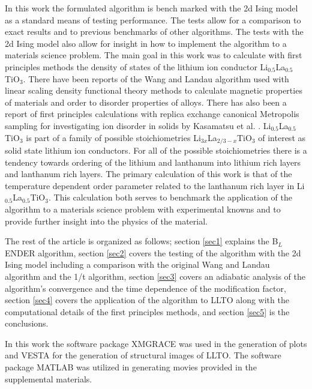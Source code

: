 \documentclass[aps,pre,reprint,superscriptaddress,showkeys]{revtex4-2}
\begin{document}
   In this work the formulated algorithm is bench marked with the 2d Ising model as a standard means of testing  performance.  The tests allow for a comparison to exact results and to previous benchmarks of other algorithms. The tests with the 2d Ising model also allow for insight in how to implement the algorithm to a materials science problem. The main goal in this work  was to calculate with first principles methods the  density of states of the lithium ion conductor Li$_{0.5}$La$_{0.5}$TiO$_3$. There  have been  reports of the Wang and Landau algorithm used with linear scaling density functional theory methods to calculate magnetic properties of materials and order to disorder properties of alloys\cite{Eisenbach, FP_Wang_Landau_CuZn}. There has also been a report of first principles calculations with replica exchange canonical Metropolis sampling for investigating ion disorder in solids by Kasamatsu et al. \cite{ion_disorder_replica}.  Li$_{0.5}$La$_{0.5}$TiO$_3$ is part of a family of possible stoichiometries Li$_{3x}$La$_{2/3 -x}$TiO$_3$ of interest as solid state lithium ion conductors\cite{domainboundaries, P4mmmstrucuture, imaginaryphonons, GENG2009555, peculiarities, LLTOreview, Li_La_ordering_computational}. For all of the possible stoichiometries there is a tendency towards ordering of the lithium and lanthanum into lithium rich layers and lanthanum rich layers.  The primary calculation of this work is that of the temperature dependent order parameter related to the lanthanum rich layer in Li$_{0.5}$La$_{0.5}$TiO$_3$. This calculation both serves to benchmark the application of the algorithm to a materials science problem with experimental knowns and to provide further insight into the physics of the material. 
   
   The rest of the article is organized as follows; section \ref{sec1} explains the B$_{L}$ENDER algorithm, section \ref{sec2} covers the testing of the algorithm with the 2d Ising model including a comparison with the original Wang and Landau algorithm and the 1/t algorithm, section \ref{sec3} covers an adiabatic analysis of the algorithm's convergence and the time dependence of the modification factor, section \ref{sec4} covers the application of the algorithm to LLTO along with the computational details of the first principles methods, and section \ref{sec5} is the conclusions. 
   
   In this work the software package XMGRACE\cite{XMGRACE} was used in the generation of plots and VESTA\cite{Vesta}  for the generation of structural images of LLTO. The software package  MATLAB \cite{MATLAB:2018} was utilized in generating movies provided in the supplemental materials. 
\end{document}
